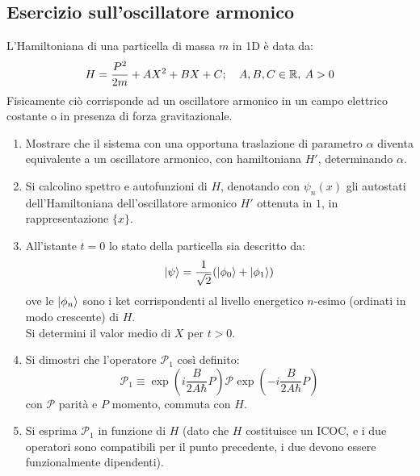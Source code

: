 \documentclass[../../FisicaTeorica.tex]{subfiles}
\begin{document}
\subsection{Esercizio sull'oscillatore armonico}
L'Hamiltoniana di una particella di massa $m$ in 1D è data da:
\[
H=\frac{P^2}{2m} + AX^2 + BX + C; \quad A,B,C \in \mathbb{R}, \> A > 0
\]
Fisicamente ciò corrisponde ad un oscillatore armonico in un campo elettrico costante o in presenza di forza gravitazionale.
\begin{enumerate}
\item Mostrare che il sistema con una opportuna traslazione di parametro $\alpha$ diventa equivalente a un oscillatore armonico, con hamiltoniana $H'$, determinando $\alpha$.
\item Si calcolino spettro e autofunzioni di $H$, denotando con $\psi_n(x)$ gli autostati dell'Hamiltoniana dell'oscillatore armonico $H'$ ottenuta in $1$, in rappresentazione $\{x\}$.
\item All'istante $t=0$ lo stato della particella sia descritto da:
\[
\ket{\psi}=\frac{1}{\sqrt{2}}(\ket{\phi_0}+\ket{\phi_1})
\]
ove le $\ket{\phi_n}$ sono i ket corrispondenti al livello energetico $n$-esimo (ordinati in modo crescente) di $H$.\\
Si determini il valor medio di $X$ per $t>0$.
\item Si dimostri che l'operatore $\mathcal{P}_1$ così definito:
\[
\mathcal{P}_1 \equiv \exp\left(i\frac{B}{2A\hbar}P\right) \mathcal{P} \exp\left(-i\frac{B}{2A\hbar}P\right)
\]
con $\mathcal{P}$ parità e $P$ momento, commuta con $H$.
\item Si esprima $\mathcal{P}_1$ in funzione di $H$ (dato che $H$ costituisce un ICOC, e i due operatori sono compatibili per il punto precedente, i due devono essere funzionalmente dipendenti).
\end{enumerate}
\end{document}
